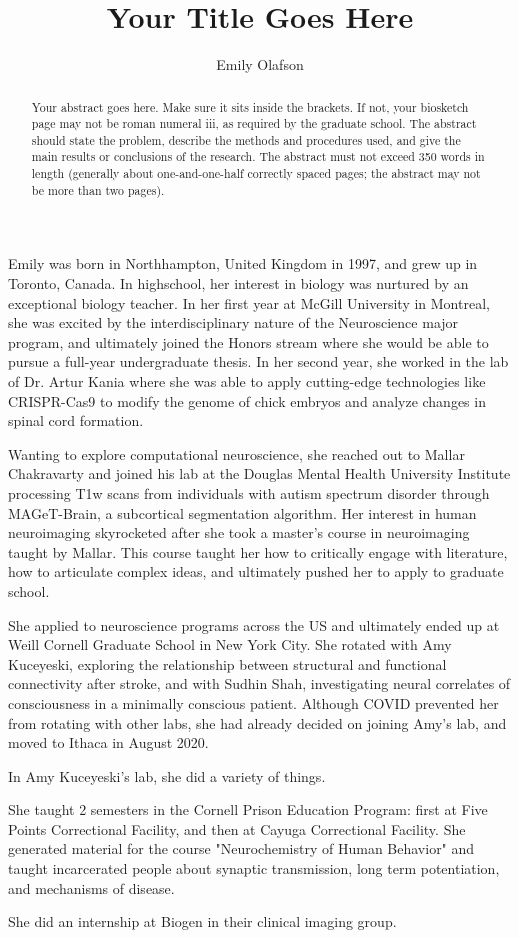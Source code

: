 \documentclass[phd,tocprelim]{cornell}
\title {Your Title Goes Here}
\author {Emily Olafson}
\begin{document}
\maketitle
\makecopyright

\begin{abstract}
Your abstract goes here. Make sure it sits inside the brackets. If not,
your biosketch page may not be roman numeral iii, as required by the
graduate school.
The abstract should state the problem, describe the methods and procedures used, and give the main results or conclusions of the research.
The abstract must not exceed 350 words in length (generally about one-and-one-half correctly spaced pages; the abstract may not be more than two pages).
\end{abstract}

\begin{biosketch}
Emily was born in Northhampton, United Kingdom in 1997, and grew up in Toronto, Canada.  In highschool, her interest in biology was nurtured  by an exceptional biology teacher.  In her first year at McGill University in Montreal, she was excited by the interdisciplinary nature of the Neuroscience major program, and ultimately joined the Honors stream where she would be able to pursue a full-year undergraduate thesis. 
In her second year, she worked in the lab of Dr. Artur Kania where she was able to apply cutting-edge technologies like CRISPR-Cas9 to modify the genome of chick embryos and analyze changes in spinal cord formation. 

 Wanting to explore computational neuroscience, she reached out to Mallar Chakravarty and joined his lab at the Douglas Mental Health University Institute processing T1w scans from individuals with autism spectrum disorder through MAGeT-Brain, a subcortical segmentation algorithm.  Her interest in human neuroimaging skyrocketed after she took a master's course in neuroimaging taught by Mallar. This course taught her how to critically engage with literature,  how to articulate complex ideas, and ultimately pushed her to apply to graduate school.

She applied to neuroscience programs across the US and ultimately ended up at Weill Cornell Graduate School in New York City.  She rotated with Amy Kuceyeski, exploring the relationship between structural and functional connectivity after stroke, and with Sudhin Shah,  investigating neural correlates of consciousness in a minimally conscious patient. Although COVID prevented her from rotating with other labs, she had already decided on joining Amy's lab, and moved to Ithaca in August 2020. 

In Amy Kuceyeski's lab,  she did a variety of things.

She taught 2 semesters in the Cornell Prison Education Program: first at Five Points Correctional Facility, and then at Cayuga Correctional Facility. She generated material for the course "Neurochemistry of Human Behavior" and taught incarcerated people about synaptic transmission, long term potentiation,  and mechanisms of disease. 

She did an internship at Biogen in their clinical imaging group.

\end{biosketch}
\end{document}
